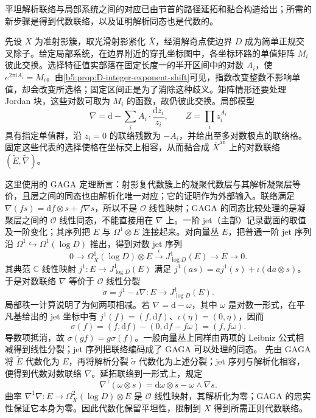 \begin{proofsketch}
	平坦解析联络与局部系统之间的对应已由节首的路径延拓和黏合构造给出；所需的新步骤是得到代数联络，以及证明解析同态也是代数的。

	先设 \(X\) 为准射影簇，取光滑射影紧化 \(\overline X\)，经消解奇点使边界 \(D\) 成为简单正规交叉除子。给定局部系统，在边界附近的穿孔坐标图中，各坐标环路的单值矩阵 \(M_i\) 彼此交换。选择特征值实部落在固定长度一的半开区间中的对数 \(A_i\)，使 \(e^{2\pi i A_i}=M_i\)。由\cref{b5:prop:D-integer-exponent-shift}可见，指数改变整数不影响单值，却会改变所选格；固定区间正是为了消除这种歧义。矩阵情形还要处理 Jordan 块，这些对数可取为 \(M_i\) 的函数，故仍彼此交换。局部模型
	\[
		\nabla=\mathrm{d}-\sum_i A_i\cdot\frac{\mathrm{d}z_i}{z_i},\qquad Z=\prod_i z_i^{A_i}
	\]
	具有指定单值群，沿 \(z_i=0\) 的联络残数为 \(-A_i\)，并给出至多对数极点的联络格。固定这些代表的选择使格在坐标交上相容，从而黏合成 \(\overline X^{\mathrm{an}}\) 上的对数联络 \((\widetilde E,\widetilde\nabla)\)。

	这里使用的 GAGA 定理断言：射影复代数簇上的凝聚代数层与其解析凝聚层等价，且层之间的同态也由解析化唯一对应；它的证明作为外部输入。联络满足 \(\nabla(fs)=\mathrm{d}f\otimes s+f\nabla s\)，所以不是 \(\mathcal O\) 线性映射；GAGA 的同态比较处理的是凝聚层之间的 \(\mathcal O\) 线性同态，不能直接用在 \(\nabla\) 上。一阶 jet（主部）记录截面的取值及一阶变化；其序列把 \(E\) 与 \(\Omega^1\otimes E\) 连接起来。对向量丛 \(E\)，把普通一阶 jet 序列沿 \(\Omega^1\hookrightarrow\Omega^1(\log D)\) 推出，得到对数 jet 序列
	\[
		0\longrightarrow\Omega^1_{\overline X}(\log D)\otimes E \xrightarrow{\iota}J^1_{\log D}(E) \longrightarrow E\longrightarrow0.
	\]
	其典范 \(\mathbb C\) 线性映射 \(j^1:E\to J^1_{\log D}(E)\) 满足 \(j^1(as)=a j^1(s)+\iota(\mathrm{d}a\otimes s)\)。于是对数联络 \(\nabla\) 等价于 \(\mathcal O\) 线性分裂
	\[
		\sigma=j^1-\iota\nabla:E\longrightarrow J^1_{\log D}(E).
	\]
	局部秩一计算说明了为何两项相减。若 \(\nabla=\mathrm{d}-\omega\)，其中 \(\omega\) 是对数一形式，在平凡基给出的 jet 坐标中有 \(j^1(f)=(f,\mathrm{d}f)\)、\(\iota(\eta)=(0,\eta)\)，因而
	\[
		\sigma(f)=(f,\mathrm{d}f)-(0,\mathrm{d}f-f\omega) =(f,f\omega).
	\]
	导数项抵消，故 \(\sigma(gf)=g\sigma(f)\)。一般向量丛上同样由两项的 Leibniz 公式相减得到线性分裂；jet 序列把联络编码成了 GAGA 可以处理的同态。 先由 GAGA 将 \(\widetilde E\) 代数化为 \(E\)，再将解析分裂 \(\widetilde\sigma\) 代数化为上述分裂；jet 序列与解析化相容，便得到代数对数联络 \(\nabla\)。延拓联络到一形式上，规定
	\[
		\nabla^1(\omega\otimes s) =\mathrm{d}\omega\otimes s-\omega\wedge\nabla s.
	\]
	曲率 \(\nabla^1\nabla:E\to\Omega^2_{\overline X}(\log D)\otimes E\) 是 \(\mathcal O\) 线性映射，其解析化为零；GAGA 的忠实性保证它本身为零。因此代数化保留平坦性，限制到 \(X\) 得到所需正则代数联络。


\end{proofsketch}
